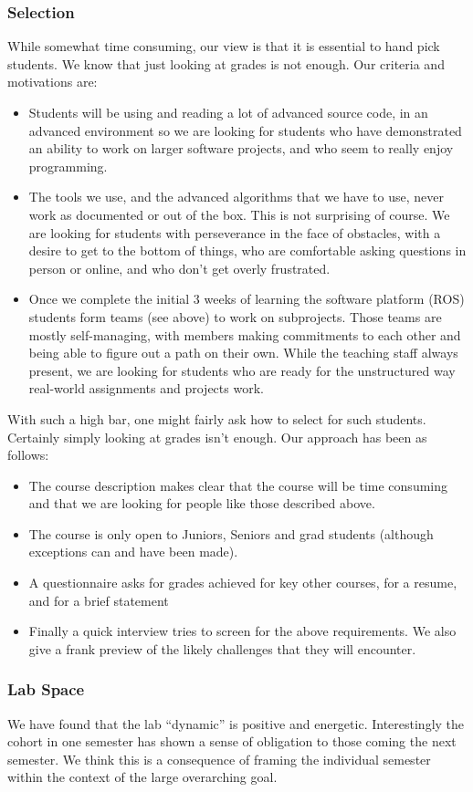 \subsubsection{Selection}While somewhat time consuming, our view is that it is essential to hand pick students. We know that just looking at grades is not enough.  Our criteria and motivations are:
\begin{itemize}
\item Students will be using and reading a lot of advanced source code, in an advanced environment so we are looking for students who have demonstrated an ability to work on larger software projects, and who seem to really enjoy programming.
\item The tools we use, and the advanced algorithms that we have to use, never work as documented or out of the box. This is not surprising of course. We are looking for students with perseverance in the face of obstacles, with a desire to get to the bottom of things, who are comfortable asking questions in person or online, and who don't get overly frustrated.
\item Once we complete the initial 3 weeks of learning the software platform (ROS) students form teams (see above) to work on subprojects. Those teams are mostly self-managing, with members making commitments to each other and being able to figure out a path on their own. While the teaching staff always present, we are looking for students who are ready for the unstructured way real-world assignments and projects work.
\end{itemize}
With such a high bar, one might fairly ask how to select for such students. Certainly simply looking at grades isn't enough. Our approach has been as follows: 
\begin{itemize}
\item The course description makes clear that the course will be time consuming and that we are looking for people like those described above.
\item The course is only open to Juniors, Seniors and grad students (although exceptions can and have been made).
\item A questionnaire asks for grades achieved for key other courses, for a resume, and for a brief statement
\item Finally a quick interview tries to screen for the above requirements.  We also give a frank preview of the likely challenges that they will encounter.
\end{itemize}
\subsubsection{Lab Space} We have found that the lab ``dynamic'' is positive and energetic. Interestingly the cohort in one semester has shown a sense of obligation to those coming the next semester. We think this is a consequence of framing the individual semester within the context of the large overarching goal.

